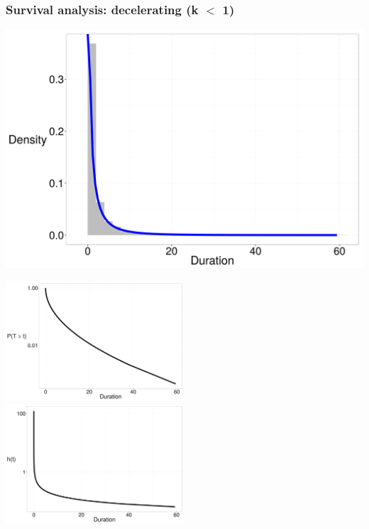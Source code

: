 \documentclass{beamer}
\begin{document}
\begin{frame}
  \frametitle{Survival analysis: decelerating (k \(<\) 1)}

  \begin{center}
    \includegraphics[height = 0.4\textheight, width = \textwidth, keepaspectratio = true]{figure/dur_dec}

    \includegraphics[height = 0.6\textheight, width = 0.5\textwidth, keepaspectratio = true]{figure/sur_dec}
    \includegraphics[height = 0.6\textheight, width = 0.5\textwidth, keepaspectratio = true]{figure/haz_dec}
  \end{center}
\end{frame}
\end{document}
